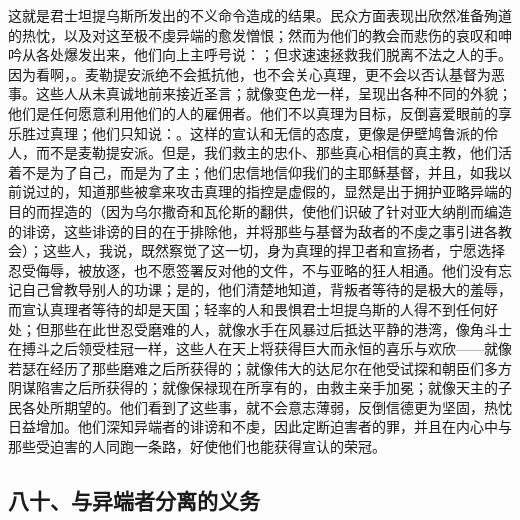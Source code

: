 这就是君士坦提乌斯所发出的不义命令造成的结果。民众方面表现出欣然准备殉道的热忱，以及对这至极不虔异端的愈发憎恨；然而为他们的教会而悲伤的哀叹和呻吟从各处爆发出来，他们向上主呼号说：；但求速速拯救我们脱离不法之人的手。因为看啊，。麦勒提安派绝不会抵抗他，也不会关心真理，更不会以否认基督为恶事。这些人从未真诚地前来接近圣言；就像变色龙一样，呈现出各种不同的外貌；他们是任何愿意利用他们的人的雇佣者。他们不以真理为目标，反倒喜爱眼前的享乐胜过真理；他们只知说：。这样的宣认和无信的态度，更像是伊壁鸠鲁派的伶人，而不是麦勒提安派。但是，我们救主的忠仆、那些真心相信的真主教，他们活着不是为了自己，而是为了主；他们忠信地信仰我们的主耶稣基督，并且，如我以前说过的，知道那些被拿来攻击真理的指控是虚假的，显然是出于拥护亚略异端的目的而捏造的（因为乌尔撒奇和瓦伦斯的翻供，使他们识破了针对亚大纳削而编造的诽谤，这些诽谤的目的在于排除他，并将那些与基督为敌者的不虔之事引进各教会）；这些人，我说，既然察觉了这一切，身为真理的捍卫者和宣扬者，宁愿选择忍受侮辱，被放逐，也不愿签署反对他的文件，不与亚略的狂人相通。他们没有忘记自己曾教导别人的功课；是的，他们清楚地知道，背叛者等待的是极大的羞辱，而宣认真理者等待的却是天国；轻率的人和畏惧君士坦提乌斯的人得不到任何好处；但那些在此世忍受磨难的人，就像水手在风暴过后抵达平静的港湾，像角斗士在搏斗之后领受桂冠一样，这些人在天上将获得巨大而永恒的喜乐与欢欣——就像若瑟在经历了那些磨难之后所获得的；就像伟大的达尼尔在他受试探和朝臣们多方阴谋陷害之后所获得的；就像保禄现在所享有的，由救主亲手加冕；就像天主的子民各处所期望的。他们看到了这些事，就不会意志薄弱，反倒信德更为坚固，热忱日益增加。他们深知异端者的诽谤和不虔，因此定断迫害者的罪，并且在内心中与那些受迫害的人同跑一条路，好使他们也能获得宣认的荣冠。\par


\subsection{八十、与异端者分离的义务}

